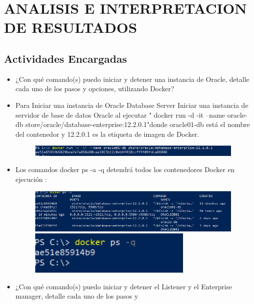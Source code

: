 \section{ANALISIS E INTERPRETACION DE RESULTADOS} 


\subsection{ Actividades Encargadas}
	\begin{itemize}
		\item ¿Con qué comando(s) puedo iniciar y detener una instancia de Oracle, detalle cada uno de los pasos y opciones,
utilizando Docker?
                     \item Para  Iniciar una instancia de Oracle Database Server
Iniciar una instancia de servidor de base de datos Oracle al ejecutar
" docker run -d -it --name oracle-db store/oracle/database-enterprise:12.2.0.1"donde oracle01-db está el nombre del contenedor y 12.2.0.1 es la etiqueta de imagen de Docker.
                      \begin{figure}[H]
		\begin{center}
		\includegraphics[width=15cm]{./Imagenes/200}
		\end{center}
		\end{figure}
                      \item Los comandos docker ps -a -q detendrá todos los contenedores Docker en ejecución :
                      \begin{figure}[H]
		\begin{center}
		\includegraphics[width=15cm]{./Imagenes/201}
                      \includegraphics[width=8cm]{./Imagenes/202}
		\end{center}
		\end{figure}
		\item ¿Con qué comando(s) puedo iniciar y detener el Listener y el Enterprise manager, detalle cada uno de los pasos y

\end{itemize}
